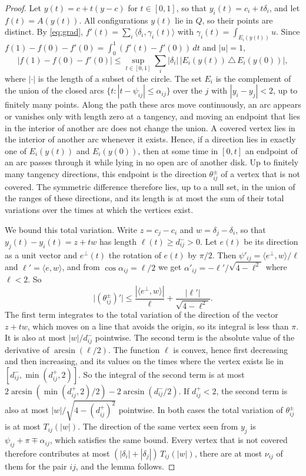 \documentclass[11pt]{amsart}
\theoremstyle{definition}
\theoremstyle{remark}
\numberwithin{equation}{section}
\begin{document}
\begin{proof}
Let $y(t)=c+t(y-c)$ for $t\in[0,1]$, so that $y_i(t)=c_i+t\delta_i$, and let $f(t)=A(y(t))$. All configurations $y(t)$ lie in $Q$, so their points are distinct. By \eqref{eq:grad}, $f'(t)=\sum_i\langle\delta_i,\gamma_i(t)\rangle$ with $\gamma_i(t)=\int_{E_i(y(t))}u$. Since $f(1)-f(0)-f'(0)=\int_0^1(f'(t)-f'(0))\,dt$ and $|u|=1$,
\[
|f(1)-f(0)-f'(0)|\le\sup_{t\in[0,1]}\sum_i|\delta_i|\,\bigl|E_i(y(t))\,\triangle\,E_i(y(0))\bigr|,
\]
where $|\cdot|$ is the length of a subset of the circle. The set $E_i$ is the complement of the union of the closed arcs $\{t:|t-\psi_{ij}|\le\alpha_{ij}\}$ over the $j$ with $|y_i-y_j|<2$, up to finitely many points. Along the path these arcs move continuously, an arc appears or vanishes only with length zero at a tangency, and moving an endpoint that lies in the interior of another arc does not change the union. A covered vertex lies in the interior of another arc whenever it exists. Hence, if a direction lies in exactly one of $E_i(y(t))$ and $E_i(y(0))$, then at some time in $[0,t]$ an endpoint of an arc passes through it while lying in no open arc of another disk. Up to finitely many tangency directions, this endpoint is the direction $\theta^\pm_{ij}$ of a vertex that is not covered. The symmetric difference therefore lies, up to a null set, in the union of the ranges of these directions, and its length is at most the sum of their total variations over the times at which the vertices exist.

We bound this total variation. Write $z=c_j-c_i$ and $w=\delta_j-\delta_i$, so that $y_j(t)-y_i(t)=z+tw$ has length $\ell(t)\ge d^-_{ij}>0$. Let $e(t)$ be its direction as a unit vector and $e^\perp(t)$ the rotation of $e(t)$ by $\pi/2$. Then $\psi'_{ij}=\langle e^\perp,w\rangle/\ell$ and $\ell'=\langle e,w\rangle$, and from $\cos\alpha_{ij}=\ell/2$ we get $\alpha'_{ij}=-\ell'/\sqrt{4-\ell^2}$ where $\ell<2$. So
\[
\bigl|(\theta^\pm_{ij})'\bigr|\le\frac{|\langle e^\perp,w\rangle|}{\ell}+\frac{|\ell'|}{\sqrt{4-\ell^2}}.
\]
The first term integrates to the total variation of the direction of the vector $z+tw$, which moves on a line that avoids the origin, so its integral is less than $\pi$. It is also at most $|w|/d^-_{ij}$ pointwise. The second term is the absolute value of the derivative of $\arcsin(\ell/2)$. The function $\ell$ is convex, hence first decreasing and then increasing, and its values on the times where the vertex exists lie in $[d^-_{ij},\min(d^+_{ij},2)]$. So the integral of the second term is at most $2\arcsin(\min(d^+_{ij},2)/2)-2\arcsin(d^-_{ij}/2)$. If $d^+_{ij}<2$, the second term is also at most $|w|/\sqrt{4-(d^+_{ij})^2}$ pointwise. In both cases the total variation of $\theta^\pm_{ij}$ is at most $T_{ij}(|w|)$. The direction of the same vertex seen from $y_j$ is $\psi_{ij}+\pi\mp\alpha_{ij}$, which satisfies the same bound. Every vertex that is not covered therefore contributes at most $(|\delta_i|+|\delta_j|)\,T_{ij}(|w|)$, there are at most $\nu_{ij}$ of them for the pair $ij$, and the lemma follows.
\end{proof}
\end{document}
